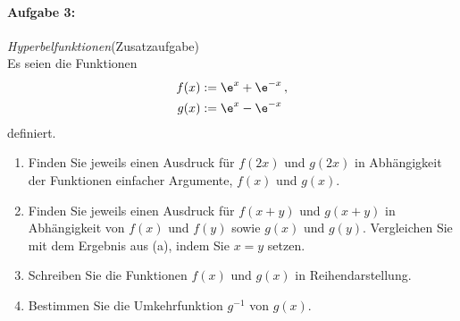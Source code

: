 \newpage
\paragraph{Aufgabe 3: } \emph{Hyperbelfunktionen}\hfill (Zusatzaufgabe)\\[0.2cm]
Es seien die Funktionen
\begin{align*}
    f(x)&:=\e^{x}+\e^{-x}\,,\\
    g(x)&:=\e^{x}-\e^{-x}
\end{align*}
definiert.
\begin{enumerate}[label=(\alph*)]
    \item Finden Sie jeweils einen Ausdruck für $f(2x)$ und $g(2x)$ in Abhängigkeit der Funktionen einfacher Argumente, $f(x)$ und $g(x)$.
    \item Finden Sie jeweils einen Ausdruck für $f(x+y)$ und $g(x+y)$ in Abhängigkeit von $f(x)$ und $f(y)$ sowie $g(x)$ und $g(y)$. Vergleichen Sie mit dem Ergebnis aus (a), indem Sie $x=y$ setzen.
    \item Schreiben Sie die Funktionen $f(x)$ und $g(x)$ in Reihendarstellung.
    \item Bestimmen Sie die Umkehrfunktion $g^{-1}$ von $g(x)$.
\end{enumerate}